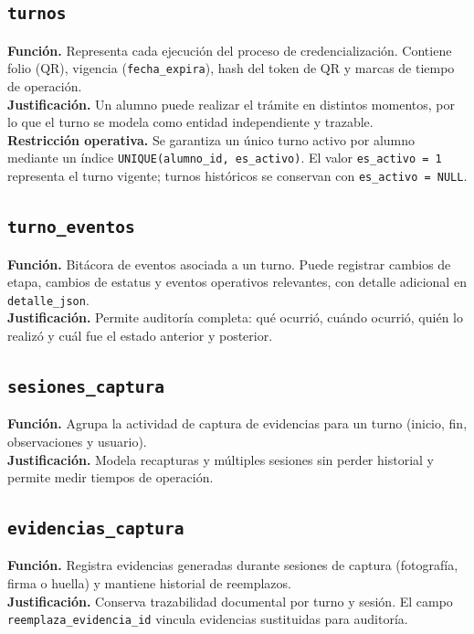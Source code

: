 \documentclass[12pt,a4paper]{article}
\begin{document}
\subsection{\texttt{turnos}}
\textbf{Función.} Representa cada ejecución del proceso de credencialización. Contiene folio (QR), vigencia (\texttt{fecha\_expira}), hash del token de QR y marcas de tiempo de operación.\\
\textbf{Justificación.} Un alumno puede realizar el trámite en distintos momentos, por lo que el turno se modela como entidad independiente y trazable.\\
\textbf{Restricción operativa.} Se garantiza un único turno activo por alumno mediante un índice \texttt{UNIQUE(alumno\_id, es\_activo)}. El valor \texttt{es\_activo = 1} representa el turno vigente; turnos históricos se conservan con \texttt{es\_activo = NULL}.

\subsection{\texttt{turno\_eventos}}
\textbf{Función.} Bitácora de eventos asociada a un turno. Puede registrar cambios de etapa, cambios de estatus y eventos operativos relevantes, con detalle adicional en \texttt{detalle\_json}.\\
\textbf{Justificación.} Permite auditoría completa: qué ocurrió, cuándo ocurrió, quién lo realizó y cuál fue el estado anterior y posterior.

\subsection{\texttt{sesiones\_captura}}
\textbf{Función.} Agrupa la actividad de captura de evidencias para un turno (inicio, fin, observaciones y usuario).\\
\textbf{Justificación.} Modela recapturas y múltiples sesiones sin perder historial y permite medir tiempos de operación.

\subsection{\texttt{evidencias\_captura}}
\textbf{Función.} Registra evidencias generadas durante sesiones de captura (fotografía, firma o huella) y mantiene historial de reemplazos.\\
\textbf{Justificación.} Conserva trazabilidad documental por turno y sesión. El campo \texttt{reemplaza\_evidencia\_id} vincula evidencias sustituidas para auditoría.
\end{document}
